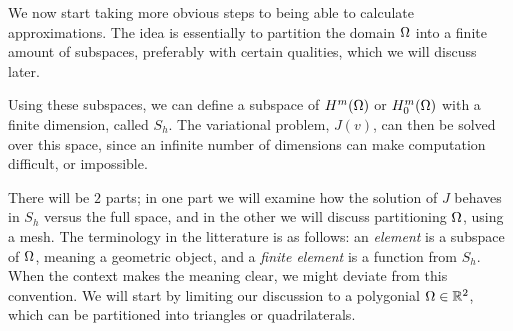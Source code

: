 We now start taking more obvious steps to being able to calculate approximations. 
The idea is essentially to partition the domain $\Omega$ into a finite amount 
of subspaces, preferably with certain qualities, which we will discuss later. 

Using these subspaces, we can define a subspace of $H^m(\Omega)$ or $H^m_0(\Omega)$ 
with a finite dimension, called $S_h$. The variational problem, $J(v)$, can then be 
solved over this space, since an infinite number of dimensions can make 
computation difficult, or impossible.

There will be $2$ parts; in one part we 
will examine how the solution of $J$ behaves in $S_h$ versus the full space, 
and in the other we will discuss partitioning $\Omega$, using a mesh.
The terminology in the litterature is as follows: an \emph{element} is a 
subspace of $\Omega$, meaning a geometric object, and a \emph{finite element} is a 
function from $S_h$. When the context makes the meaning clear, we might deviate from 
this convention.
We will start by limiting our discussion to a polygonial $\Omega \in \mathbb{R}^2$, which 
can be partitioned into triangles or quadrilaterals.